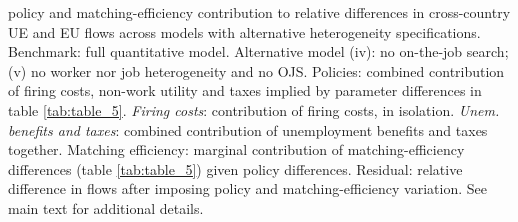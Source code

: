 \begin{table}[!h]
{{policy and matching-efficiency contribution to relative differences in cross-country UE and EU flows across models with alternative heterogeneity specifications. 
Benchmark: full quantitative model. Alternative model (iv): no on-the-job search;
(v) no worker nor job heterogeneity and no OJS. Policies: combined contribution of firing costs, non-work utility and taxes implied by parameter differences in table \ref{tab:table_5}.
\textit{Firing costs}: contribution of firing costs, in isolation. \textit{Unem. benefits and taxes}: combined contribution of unemployment benefits and taxes together.
Matching efficiency: marginal contribution of matching-efficiency differences (table \ref{tab:table_5}) given policy differences. Residual: relative difference in flows after imposing policy and matching-efficiency variation. See main text for additional details.}}
\end{table}